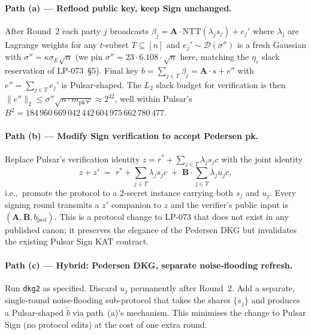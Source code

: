 \paragraph{Path (a) --- Reflood public key, keep Sign unchanged.}
After Round~2 each party $j$ broadcasts
$\beta_j = \mathbf{A}\cdot\mathrm{NTT}(\lambda_j s_j) + e_j'$ where
$\lambda_j$ are Lagrange weights for any $t$-subset $T\subseteq[n]$ and
$e_j'\sim\mathcal{D}(\sigma'')$ is a fresh Gaussian with
$\sigma'' = \kappa\sigma_E\sqrt{n}$ (we pin
$\sigma'' = 23\cdot 6.108\cdot\sqrt{n}$ here, matching the
$\eta_\varepsilon$ slack reservation of LP-073~\S5). Final key
$b = \sum_{j\in T}\beta_j = \mathbf{A}\cdot s + e''$ with
$e'' = \sum_{j\in T} e_j'$ is Pulsar-shaped. The $L_2$ slack budget
for verification is then
$\|e''\|_2\le\sigma''\sqrt{n\cdot m_{\textrm{pk}}\varphi}\approx
2^{42}$, well within Pulsar's $B^2 = 184\,960\,669\,042\,442\,604\,975\,662\,780\,477$.

\paragraph{Path (b) --- Modify Sign verification to accept Pedersen pk.}
Replace Pulsar's verification identity
$z = r^* + \sum_{j\in T}\lambda_j s_j c$ with the joint identity
\[
z + z'
\;=\; r^* + \sum_{j\in T}\lambda_j s_j c
\;+\; \mathbf{B}\cdot\sum_{j\in T}\lambda_j u_j c,
\]
i.e.,\ promote the protocol to a 2-secret instance carrying both $s_j$
and $u_j$. Every signing round transmits a $z'$ companion to $z$ and
the verifier's public input is $(\mathbf{A}, \mathbf{B}, b_{\mathrm{ped}})$.
This is a protocol change to LP-073 that does not exist in any
published canon; it preserves the elegance of the Pedersen DKG but
invalidates the existing Pulsar Sign KAT contract.

\paragraph{Path (c) --- Hybrid: Pedersen DKG, separate noise-flooding refresh.}
Run \texttt{dkg2} as specified. Discard $u_j$ permanently after
Round~2. Add a separate, single-round noise-flooding sub-protocol that
takes the shares $\{s_j\}$ and produces a Pulsar-shaped $\tilde b$ via
path~(a)'s mechanism. This minimises the change to Pulsar Sign (no
protocol edits) at the cost of one extra round.


